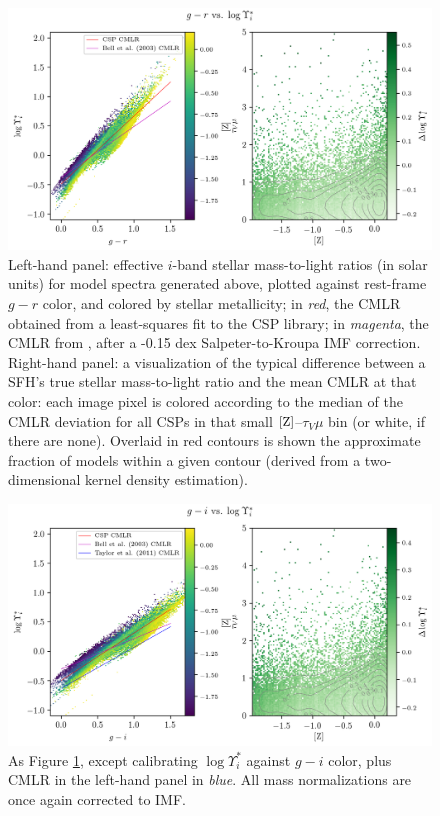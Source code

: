\begin{figure}
    \centering
    \includegraphics[width=\textwidth]{CMLRDiag_CgrMLi_logzsol-tau_V__mu-dev}
    \caption[Color--mass-to-light ratio relations ($g-r$ to $i$-band) for the training data]{\fixspacing Left-hand panel: effective $i$-band stellar mass-to-light ratios (in solar units) for model spectra generated  above, plotted against rest-frame $g-r$ color, and colored by stellar metallicity; in \emph{red}, the CMLR obtained from a least-squares fit to the CSP library; in \emph{magenta}, the CMLR from \citet{bell_03}, after a -0.15 dex Salpeter-to-Kroupa IMF correction. Right-hand panel: a visualization of the typical difference between a SFH's true stellar mass-to-light ratio and the mean CMLR at that color: each image pixel is colored according to the median of the CMLR deviation for all CSPs in that small ${\rm [Z]}$--$\tau_V \mu$ bin (or white, if there are none). Overlaid in red contours is shown the approximate fraction of models within a given contour (derived from a two-dimensional kernel density estimation).}
    \label{fig:CMLR_Cgr-MLi-dev}
\end{figure}

\begin{figure}
    \centering
    \includegraphics[width=\textwidth]{CMLRDiag_CgiMLi_logzsol-tau_V__mu-dev}
    \caption[Color--mass-to-light ratio relations ($g-i$ vs $i$-band) for the training data]{\fixspacing As Figure \ref{fig:CMLR_Cgr-MLi-dev}, except calibrating $\log \Upsilon^*_i$ against $g-i$ color, plus \citet{taylor_gama_cmlrs} CMLR in the left-hand panel in \emph{blue}. All mass normalizations are once again corrected to \citet{kroupa_imf_01} IMF.}
    \label{fig:CMLR_Cgi-MLi-dev}
\end{figure}

